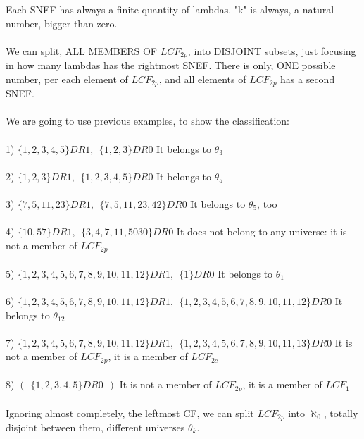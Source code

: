 		\noindent
		Each SNEF has always a finite quantity of lambdas. "k" is always, a natural number, bigger than zero.
		\\\\
		
		\noindent
		We can split, ALL MEMBERS OF $LCF_{2p}$, into DISJOINT subsets, just focusing in how many lambdas has the rightmost SNEF. There is only, ONE possible number, per each element of $LCF_{2p}$, and all elements of $LCF_{2p}$ has a second SNEF.
		\\\\
		
		\noindent
		We are going to use previous examples, to show the classification:\\\\
		1) $\{1,2,3,4,5\}DR1,\:\: \{1,2,3\}DR0$ \textrightarrow It belongs to $\theta_{3}$\\\\
		2) $\{1,2,3\}DR1,\:\: \{1,2,3,4,5\}DR0$ \textrightarrow It belongs to $\theta_{5}$\\\\
		3) $\{7,5,11,23\}DR1,\:\: \{7,5,11,23,42\}DR0$ \textrightarrow It belongs to $\theta_{5}$, too\\\\
		4) $\{10,57\}DR1,\:\: \{3,4,7,11,5030\}DR0$ \textrightarrow It does not belong to any universe: it is not a member of $LCF_{2p}$\\\\
		5) $\{1,2,3,4,5,6,7,8,9,10,11,12\}DR1, \:\: \{1\}DR0$ \textrightarrow It belongs to $\theta_{1}$\\\\
		6) $\{1,2,3,4,5,6,7,8,9,10,11,12\}DR1, \:\: \{1,2,3,4,5,6,7,8,9,10,11,12\}DR0$ \textrightarrow It belongs to $\theta_{12}$\\\\
		7) $\{1,2,3,4,5,6,7,8,9,10,11,12\}DR1, \:\: \{1,2,3,4,5,6,7,8,9,10,11,13\}DR0$ \textrightarrow It is not a member of $LCF_{2p}$, it is a member of $LCF_{2c}$\\\\
		8) $(\:\:\{1,2,3,4,5\}DR0 \:\:)$ \textrightarrow It is not a member of $LCF_{2p}$, it is a member of $LCF_{1}$
		\\\\
		
		\noindent
		Ignoring almost completely, the leftmost CF, we can split $LCF_{2p}$ into $\aleph_{0}$, totally disjoint between them, different universes $\theta_{k}$.
		\\\\
	
